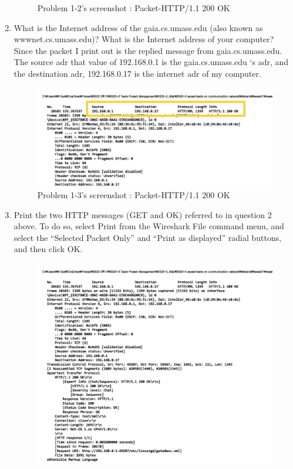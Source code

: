 \begin{enumerate}[label=\bfseries Problem \arabic*:,leftmargin=*,labelindent=1em]
\begin{figure}[!h]
        		\caption{\footnotesize Problem 1-2's screenshot : Packet-HTTP/1.1 200 OK}
        		\vspace{-10pt}
            \end{figure}
        \item What is the Internet address of the gaia.cs.umass.edu (also known as wwwnet.cs.umass.edu)? 
        What is the Internet address of your computer?\\[0.2mm]
            \soln Since the packet I print out is the replied message from gaia.cs.umass.edu.
            The source adr that value of 192.168.0.1 is the gaia.cs.umass.edu ‘s adr, and the destination adr, 192.168.0.17 is the internet adr of my computer.
\newpage
            \vspace{-4mm}  
            \begin{figure}[!h]\centering
        		\includegraphics[width=.85\textwidth]{image/result_week01/Q1-3.jpg}
        		\caption{\footnotesize Problem 1-3's screenshot : Packet-HTTP/1.1 200 OK}
        		\vspace{-10pt}
            \end{figure}
        \item Print the two HTTP messages (GET and OK) referred to in question 2 above. 
        To do so, select Print from the Wireshark File command menu, and select the “Selected Packet Only” 
        and “Print as displayed” radial buttons, and then click OK.\\[0.2mm]
            \soln 
            \vspace{-4mm}  
            \begin{figure}[!h]\centering
        		\includegraphics[width=.85\textwidth]{image/result_week01/Q1-4.jpg}

\end{figure}
\end{enumerate}
